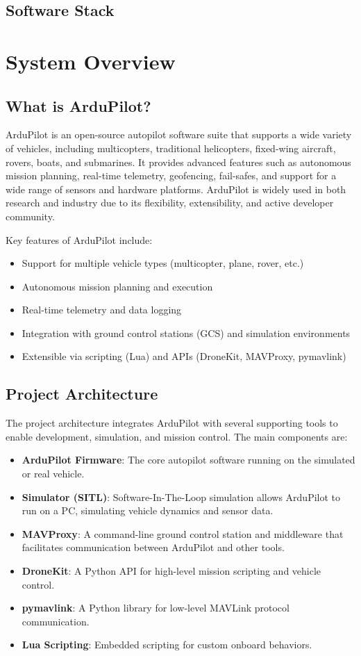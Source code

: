 \documentclass[12pt,a4paper]{report}
\begin{document}
\section{Software Stack}

\chapter{System Overview}

\section{What is ArduPilot?}
ArduPilot is an open-source autopilot software suite that supports a wide variety of vehicles, including multicopters, traditional helicopters, fixed-wing aircraft, rovers, boats, and submarines. It provides advanced features such as autonomous mission planning, real-time telemetry, geofencing, fail-safes, and support for a wide range of sensors and hardware platforms. ArduPilot is widely used in both research and industry due to its flexibility, extensibility, and active developer community.

Key features of ArduPilot include:
\begin{itemize}
    \item Support for multiple vehicle types (multicopter, plane, rover, etc.)
    \item Autonomous mission planning and execution
    \item Real-time telemetry and data logging
    \item Integration with ground control stations (GCS) and simulation environments
    \item Extensible via scripting (Lua) and APIs (DroneKit, MAVProxy, pymavlink)
\end{itemize}

\section{Project Architecture}
The project architecture integrates ArduPilot with several supporting tools to enable development, simulation, and mission control. The main components are:
\begin{itemize}
    \item \textbf{ArduPilot Firmware}: The core autopilot software running on the simulated or real vehicle.
    \item \textbf{Simulator (SITL)}: Software-In-The-Loop simulation allows ArduPilot to run on a PC, simulating vehicle dynamics and sensor data.
    \item \textbf{MAVProxy}: A command-line ground control station and middleware that facilitates communication between ArduPilot and other tools.
    \item \textbf{DroneKit}: A Python API for high-level mission scripting and vehicle control.
    \item \textbf{pymavlink}: A Python library for low-level MAVLink protocol communication.
    \item \textbf{Lua Scripting}: Embedded scripting for custom onboard behaviors.
\end{itemize}
\end{document}
